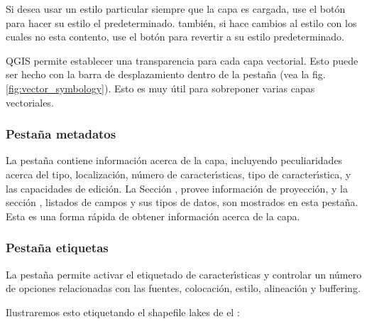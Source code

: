 Si desea usar un estilo particular siempre que la capa es cargada, 
use el bot\'on  para hacer su estilo el predeterminado. también, 
si hace cambios al estilo con los cuales no esta contento, use el bot\'on  para revertir a su estilo predeterminado.

 \label{sec:vect_transparency} 
QGIS \CURRENT permite establecer una transparencia para cada capa vectorial. Esto puede ser hecho con
la barra de desplazamiento  dentro de la pesta\~na  (vea la fig. \ref{fig:vector_symbology}).
Esto es muy \'util para sobreponer varias capas vectoriales.

\subsubsection{Pesta\~na metadatos}

La pesta\~na  contiene informaci\'on acerca de la capa, incluyendo peculiaridades
acerca del tipo, localizaci\'on, n\'umero de caracter\'{\i}sticas, tipo de caracter\'{\i}stica, y las capacidades de edici\'on.
La Secci\'on , provee 
informaci\'on de proyecci\'on, y la secci\'on ,
listados de campos y sus tipos de datos, son mostrados en esta pesta\~na. Esta es una forma r\'apida de obtener informaci\'on acerca de la capa.

\subsubsection{Pesta\~na etiquetas}

La pesta\~na  permite activar el etiquetado de caracter\'{\i}sticas y controlar un n\'umero de opciones
relacionadas con las fuentes, colocaci\'on, estilo, alineaci\'on y buffering.

Ilustraremos esto etiquetando el shapefile lakes de el 
:

